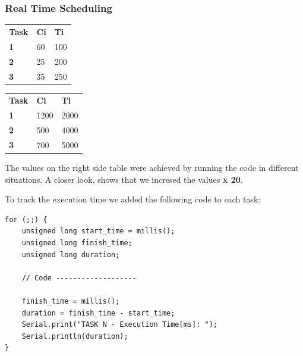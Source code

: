 \documentclass[11pt]{article}
\begin{document}
\subsubsection{Real Time Scheduling}

\begin{table}[!htb]
    \caption{Theoretical values (left) and implemented values (right) in \textit{ms}:}
    \begin{minipage}{0.7\linewidth}
		\begin{table}[H]
		\begin{tabular}{lll}
		\textbf{Task} & \textbf{Ci} & \textbf{Ti} \\
		\textbf{1}    & 60         & 100           \\
		\textbf{2}    & 25         & 200           \\
		\textbf{3}    & 35         & 250          
		\end{tabular}
		\label{table:rt-1}
		\end{table}
    \end{minipage}%
    \begin{minipage}{.5\linewidth}
		\begin{table}[H]
		\begin{tabular}{lll}
		\textbf{Task} & \textbf{Ci} & \textbf{Ti} \\
		\textbf{1}    & 1200         & 2000           \\
		\textbf{2}    & 500         & 4000           \\
		\textbf{3}    & 700         & 5000          
		\end{tabular}
		\label{table:rt-2}
		\end{table}
    \end{minipage} 
\end{table}

The values on the right side table were achieved by running the code in different situations. A closer look, shows that we incresed the values \textbf{x 20}.

To track the execution time we added the following code to each task:

\begin{verbatim}
for (;;) {
    unsigned long start_time = millis();
    unsigned long finish_time;
    unsigned long duration;

    // Code -------------------

    finish_time = millis();      
    duration = finish_time - start_time;
    Serial.print("TASK N - Execution Time[ms]: ");
    Serial.println(duration); 
}
\end{verbatim}
\end{document}
